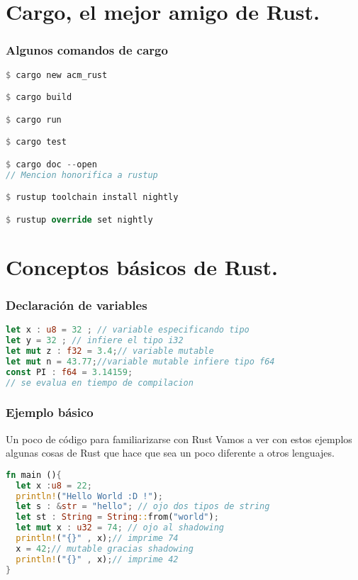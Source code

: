 \documentclass{beamer}
\begin{document}

\section{Cargo, el mejor amigo de Rust.}
\begin{frame}[fragile]
  \frametitle{Algunos comandos de cargo}
  \begin{lstlisting}[language=Rust , style=boxed_command]
$ cargo new acm_rust

$ cargo build 

$ cargo run

$ cargo test

$ cargo doc --open
// Mencion honorifica a rustup

$ rustup toolchain install nightly

$ rustup override set nightly\end{lstlisting}

\end{frame}

\section{Conceptos básicos de Rust.}
\begin{frame}[fragile]
  \frametitle{Declaración de variables }
  \begin{lstlisting}[language=Rust, style=boxed ]
let x : u8 = 32 ; // variable especificando tipo  
let y = 32 ; // infiere el tipo i32
let mut z : f32 = 3.4;// variable mutable
let mut n = 43.77;//variable mutable infiere tipo f64
const PI : f64 = 3.14159;
// se evalua en tiempo de compilacion\end{lstlisting}
  \end{frame}

  \begin{frame}[fragile]
    \frametitle{Ejemplo básico}
    \begin{block}{Un poco de código para familiarizarse con Rust}
      Vamos a ver con estos ejemplos algunas cosas de Rust que hace que sea un poco diferente a otros lenguajes.
    \end{block}  
      \begin{lstlisting}[language=Rust, style=boxed ]
fn main (){
  let x :u8 = 22;
  println!("Hello World :D !");
  let s : &str = "hello"; // ojo dos tipos de string
  let st : String = String::from("world");
  let mut x : u32 = 74; // ojo al shadowing
  println!("{}" , x);// imprime 74 
  x = 42;// mutable gracias shadowing
  println!("{}" , x);// imprime 42 
}\end{lstlisting}
  \end{frame}
      
\end{document}
